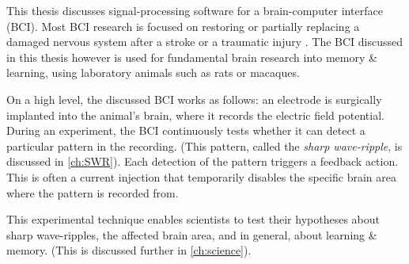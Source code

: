 


\label{sec:BCI}

This thesis discusses signal-processing software for a brain-computer interface (BCI).\footnotemark{} Most BCI research is focused on restoring or partially replacing a damaged nervous system after a stroke or a traumatic injury \cite{Krucoff2016}. The BCI discussed in this thesis however is used for fundamental brain research into memory \& learning, using laboratory animals such as rats or macaques.


On a high level, the discussed BCI works as follows: an electrode is surgically implanted into the animal's brain, where it records the electric field potential. During an experiment, the BCI continuously tests whether it can detect a particular pattern in the recording. (This pattern, called the \emph{sharp wave-ripple}, is discussed in \cref{ch:SWR}). Each detection of the pattern triggers a feedback action. This is often a current injection that temporarily disables the specific brain area where the pattern is recorded from.

This experimental technique enables scientists to test their hypotheses about sharp wave-ripples, the affected brain area, and in general, about learning \& memory. (This is discussed further in \cref{ch:science}).




\label{sec:problem}




